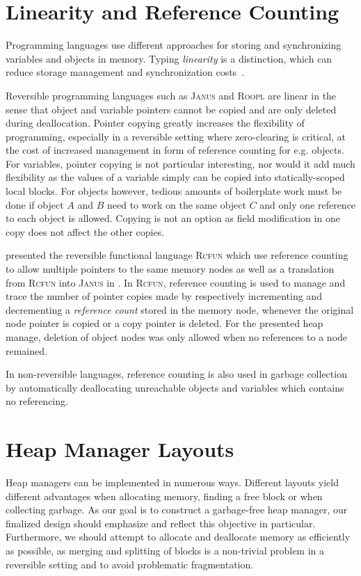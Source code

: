 \section{Linearity and Reference Counting}
\label{sec:referencing}
Programming languages use different approaches for storing and synchronizing variables and objects in memory. Typing \textit{linearity} is a distinction, which can reduce storage management and synchronization costs~\cite{hb:linearity}.

Reversible programming languages such as \textsc{Janus} and \textsc{Roopl} are linear in the sense that object and variable pointers cannot be copied and are only deleted during deallocation. Pointer copying greatly increases the flexibility of programming, especially in a reversible setting where zero-clearing is critical, at the cost of increased management in form of reference counting for e.g. objects. For variables, pointer copying is not particular interesting, nor would it add much flexibility as the values of a variable simply can be copied into statically-scoped local blocks. For objects however, tedious amounts of boilerplate work must be done if object $A$ and $B$ need to work on the same object $C$ and only one reference to each object is allowed. Copying is not an option as field modification in one copy does not affect the other copies.  

\citeauthor{tm:refcounting} presented the reversible functional language \textsc{Rcfun} which use reference counting to allow multiple pointers to the same memory nodes as well as a translation from \textsc{Rcfun} into \textsc{Janus} in \cite{tm:refcounting}. In \textsc{Rcfun}, reference counting is used to manage and trace the number of pointer copies made by respectively incrementing and decrementing a \textit{reference count} stored in the memory node, whenever the original node pointer is copied or a copy pointer is deleted. For the presented heap manage, deletion of object nodes was only allowed when no references to a node remained.

In non-reversible languages, reference counting is also used in garbage collection by automatically deallocating unreachable objects and variables which contains no referencing. 


\section{Heap Manager Layouts}
\label{sec:heap-manager-layout}
Heap managers can be implemented in numerous ways. Different layouts yield different advantages when allocating memory, finding a free block or when collecting garbage. As our goal is to construct a garbage-free heap manager, our finalized design should emphasize and reflect this objective in particular. Furthermore, we should attempt to allocate and deallocate memory as efficiently as possible, as merging and splitting of blocks is a non-trivial problem in a reversible setting and to avoid problematic fragmentation.

